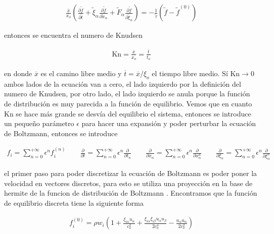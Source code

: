 \begin{eqnarray}
\frac{\overline{x}}{x_{o}}\left(\frac{\partial \widetilde{f}}{\partial \widetilde{t}}+\widetilde{\xi}_{\alpha}\frac{\partial \widetilde{f}}{\partial \widetilde{x}_{\alpha}}+\widetilde{F}_{\alpha}\frac{\partial \widetilde{f}}{\partial \widetilde{\xi}_{\alpha}}\right)=-\frac{1}{\widetilde{\tau}}\left(\widetilde{f}-\widetilde{f}^{(0)}\right)
\end{eqnarray}

\noindent entonces se encuentra el numero de Knudsen 

\begin{eqnarray}
\label{Kn}
\text{Kn} = \frac{\overline{x}}{x_{o}}=\frac{\overline{t}}{t_{o}}
\end{eqnarray}

\noindent en donde $\overline{x}$ es el camino libre medio y $\overline{t} = \overline{x}/\xi_{o}$ el tiempo libre medio. Sí $\text{Kn}\rightarrow0$ ambos lados de la ecuación van a cero, el lado izquierdo por la definición del numero de Knudsen, por otro lado, el lado izquierdo se anula porque la función de distribución es muy parecida a la función de equilibrio. Vemos que en cuanto Kn se hace más grande se desvía del equilibrio el sistema, entonces se introduce un pequeño parámetro $\epsilon$ para hacer una expansión y poder perturbar la ecuación de Boltzmann, entonces se introduce

\begin{eqnarray}
f_{i} = \sum_{n=0}^{+\infty}\epsilon^{n}f_{i}^{(n)}\qquad \frac{\partial}{\partial t} = \sum_{n=0}^{+\infty}\epsilon^{n}\frac{\partial}{\partial t_{n}}\qquad\frac{\partial}{\partial x_{\alpha}} = \sum_{n=0}^{+\infty}\epsilon^{n}\frac{\partial}{\partial x_{\alpha}^{n}}\qquad\frac{\partial}{\partial \xi_{\alpha}} = \sum_{n=0}^{+\infty}\epsilon^{n}\frac{\partial}{\partial \xi_{\alpha}^{n}}
\end{eqnarray}

\noindent el primer paso para poder discretizar la ecuación de Boltzmann es poder poner la velocidad en vectores discretos, para esto se utiliza una proyección en la base de hermite de la funcion de distribución de Boltzmann \cite{kruger}. Encontramos que la función de equilibrio discreta tiene la siguiente forma 

\begin{eqnarray}
\label{equilibrio}
\boxed{
f_{i}^{(0)} = \rho w_{i}\left(1+\frac{\xi_{i\alpha}u_{\alpha}}{c_{o}^{2}}+\frac{\xi_{i\alpha}\xi_{i\beta}u_{\alpha}u_{\beta}}{2c_{o}^{4}}-\frac{u_{\alpha}u_{\alpha}}{2c_{o}^{2}}\right)
}
\end{eqnarray}

